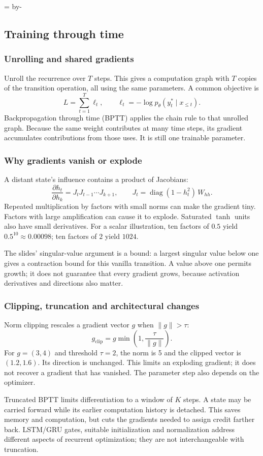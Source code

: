 \documentclass[11pt]{article}
\newcommand{\newsubsection}[1]{\par\begingroup\skip0=\pagegoal\advance\skip0 by-\pagetotal\ifdim\skip0<12\baselineskip\newpage\fi\endgroup\subsection{#1}}
\begin{document}
\newsubsection{Training through time}
\subsubsection{Unrolling and shared gradients}
Unroll the recurrence over $T$ steps. This gives a computation graph with $T$ copies of the transition operation, all using the same parameters. A common objective is
\[
L=\sum_{t=1}^{T}\ell_t,\qquad
\ell_t=-\log p_\theta(y_t^*\mid x_{\leq t}).
\]
Backpropagation through time (BPTT) applies the chain rule to that unrolled graph. Because the same weight contributes at many time steps, its gradient accumulates contributions from those uses. It is still one trainable parameter.

\subsubsection{Why gradients vanish or explode}
A distant state's influence contains a product of Jacobians:
\[
\frac{\partial h_t}{\partial h_k}
=J_tJ_{t-1}\cdots J_{k+1},\qquad
J_t=\operatorname{diag}(1-h_t^2)\,W_{hh}.
\]
Repeated multiplication by factors with small norms can make the gradient tiny. Factors with large amplification can cause it to explode. Saturated $\tanh$ units also have small derivatives. For a scalar illustration, ten factors of $0.5$ yield $0.5^{10}\approx0.00098$; ten factors of $2$ yield $1024$.

The slides' singular-value argument is a bound: a largest singular value below one gives a contraction bound for this vanilla transition. A value above one permits growth; it does not guarantee that every gradient grows, because activation derivatives and directions also matter.

\subsubsection{Clipping, truncation and architectural changes}
Norm clipping rescales a gradient vector $g$ when $\|g\|>\tau$:
\[
g_{\mathrm{clip}}=g\min\left(1,\frac{\tau}{\|g\|}\right).
\]
For $g=(3,4)$ and threshold $\tau=2$, the norm is 5 and the clipped vector is $(1.2,1.6)$. Its direction is unchanged. This limits an exploding gradient; it does not recover a gradient that has vanished. The parameter step also depends on the optimizer.

Truncated BPTT limits differentiation to a window of $K$ steps. A state may be carried forward while its earlier computation history is detached. This saves memory and computation, but cuts the gradients needed to assign credit farther back. LSTM/GRU gates, suitable initialization and normalization address different aspects of recurrent optimization; they are not interchangeable with truncation.
\end{document}
